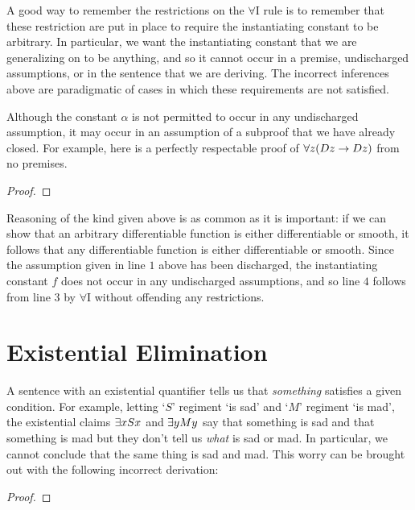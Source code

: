 A good way to remember the restrictions on the $\forall$I rule is to remember that these restriction are put in place to require the instantiating constant to be arbitrary.
In particular, we want the instantiating constant that we are generalizing on to be anything, and so it cannot occur in a premise, undischarged assumptions, or in the sentence that we are deriving.
The incorrect inferences above are paradigmatic of cases in which these requirements are not satisfied.

Although the constant $\alpha$ is not permitted to occur in any undischarged assumption, it may occur in an assumption of a subproof that we have already closed.
For example, here is a perfectly respectable proof of $\forall z(Dz \rightarrow Dz)$ from no premises.

\begin{proof}
	\open
		 \as{}
		 
	\close
\end{proof}

Reasoning of the kind given above is as common as it is important: if we can show that an arbitrary differentiable function is either differentiable or smooth, it follows that any differentiable function is either differentiable or smooth.
Since the assumption given in line $1$ above has been discharged, the instantiating constant $f$ does not occur in any undischarged assumptions, and so line $4$ follows from line $3$ by $\forall$I without offending any restrictions. 



\section{Existential Elimination}
  \label{sec:ExistElim}

A sentence with an existential quantifier tells us that \textit{something} satisfies a given condition.
For example, letting `$S$' regiment `is sad' and `$M$' regiment `is mad', the existential claims $\exists x Sx$ and $\exists y My$ say that something is sad and that something is mad but they don't tell us \textit{what} is sad or mad.
In particular, we cannot conclude that the same thing is sad and mad.
This worry can be brought out with the following incorrect derivation:

\begin{proof}
   \pr{}
	 \pr{}
    
   
   
   
\end{proof}


